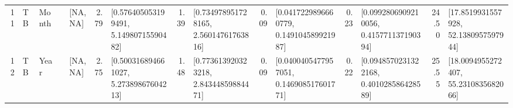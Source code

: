 \begin{table}[ht]
\begin{tabular}{rllrlrlrlrlrlrl}
  11 & TB & Month &  & [NA, NA] & 2.79 & [0.576405053199491, 5.14980715590482] & 1.39 & [0.734978951728165, 2.56014761763816] & 0.09 & [0.0417229896660779, 0.149104589921987] & 0.23 & [0.0992806909210056, 0.415771137190394] & 24.50 & [17.8519931557928, 52.1380957597944] \\ 
  12 & TB & Year &  & [NA, NA] & 2.75 & [0.500316894661027, 5.27389867604213] & 1.48 & [0.773613920323218, 2.84344859884471] & 0.09 & [0.0400405477957051, 0.146908517601771] & 0.22 & [0.0948570231322168, 0.401028586428589] & 25.55 & [18.0094955272407, 55.2310835682066] \\ 
   \hline
\end{tabular}
\end{table}
